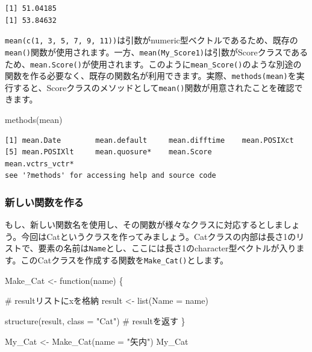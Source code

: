 \documentclass[
  a4paper,
  pandoc,
  ja=standard,
  jafont=haranoaji]{bxjsbook}
\newenvironment{Shaded}{\begin{snugshade}}{\end{snugshade}}
\newcommand{\AttributeTok}[1]{\textcolor[rgb]{0.00,0.48,0.65}{#1}}
\newcommand{\CommentTok}[1]{\textcolor[rgb]{0.37,0.37,0.37}{#1}}
\newcommand{\ControlFlowTok}[1]{\textcolor[rgb]{0.00,0.48,0.65}{#1}}
\newcommand{\FunctionTok}[1]{\textcolor[rgb]{0.28,0.35,0.67}{#1}}
\newcommand{\NormalTok}[1]{\textcolor[rgb]{0.00,0.48,0.65}{#1}}
\newcommand{\OtherTok}[1]{\textcolor[rgb]{0.00,0.48,0.65}{#1}}
\newcommand{\StringTok}[1]{\textcolor[rgb]{0.13,0.47,0.30}{#1}}
\begin{document}
\begin{verbatim}
[1] 51.04185
[1] 53.84632
\end{verbatim}

\texttt{mean(c(1,\ 3,\ 5,\ 7,\ 9,\ 11))}は引数がnumeric型ベクトルであるため、既存の\texttt{mean()}関数が使用されます。一方、\texttt{mean(My\_Score1)}は引数がScoreクラスであるため、\texttt{mean.Score()}が使用されます。このように\texttt{mean\_Score()}のような別途の関数を作る必要なく、既存の関数名が利用できます。実際、\texttt{methods(mean)}を実行すると、Scoreクラスのメソッドとして\texttt{mean()}関数が用意されたことを確認できます。

\begin{Shaded}
\begin{Highlighting}[numbers=left,,]
\FunctionTok{methods}\NormalTok{(mean)}
\end{Highlighting}
\end{Shaded}

\begin{verbatim}
[1] mean.Date        mean.default     mean.difftime    mean.POSIXct    
[5] mean.POSIXlt     mean.quosure*    mean.Score       mean.vctrs_vctr*
see '?methods' for accessing help and source code
\end{verbatim}

\hypertarget{ux65b0ux3057ux3044ux95a2ux6570ux3092ux4f5cux308b}{%
\subsubsection{新しい関数を作る}\label{ux65b0ux3057ux3044ux95a2ux6570ux3092ux4f5cux308b}}

もし、新しい関数名を使用し、その関数が様々なクラスに対応するとしましょう。今回はCatというクラスを作ってみましょう。Catクラスの内部は長さ1のリストで、要素の名前は\texttt{Name}とし、ここには長さ1のcharacter型ベクトルが入ります。このCatクラスを作成する関数を\texttt{Make\_Cat()}とします。

\begin{Shaded}
\begin{Highlighting}[numbers=left,,]
\NormalTok{Make\_Cat }\OtherTok{\textless{}{-}} \ControlFlowTok{function}\NormalTok{(name) \{}
  
  \CommentTok{\# resultリストにxを格納}
\NormalTok{  result }\OtherTok{\textless{}{-}} \FunctionTok{list}\NormalTok{(}\AttributeTok{Name =}\NormalTok{ name)}
  
  \FunctionTok{structure}\NormalTok{(result, }\AttributeTok{class =} \StringTok{"Cat"}\NormalTok{) }\CommentTok{\# resultを返す}
\NormalTok{\}}

\NormalTok{My\_Cat }\OtherTok{\textless{}{-}} \FunctionTok{Make\_Cat}\NormalTok{(}\AttributeTok{name =} \StringTok{"矢内"}\NormalTok{)}
\NormalTok{My\_Cat}
\end{Highlighting}
\end{Shaded}
\end{document}
